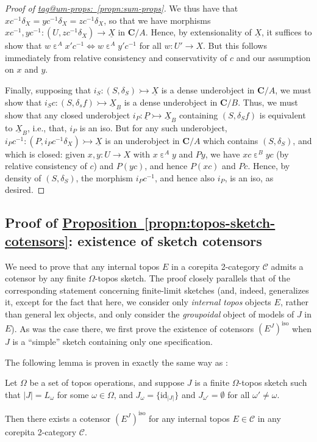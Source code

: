 \documentclass{amsart}
\makeatletter
\newcommand\abs[2][]{#1\lvert{#2}#1\rvert}
\newcommand\alttext{\texorpdfstring}
\newcommand\bC{\mathbf{C}}
\newcommand\cC{\mathcal{C}}
\newcommand\ein{\mathrel{\varepsilon}}
\newcommand\id{\mathrm{id}}
\newcommand\iso{\mathrm{iso}}
\newcommand\I{^{-1}}
\newcommand\set[2][]{#1\{ #2 #1\}}
\newcommand\ToT{\Leftrightarrow}
\newcommand\tto{\rightarrowtail}
\newcommand\und[1]{\underline{#1}}
\newcommand\tagword[1]{\csname tag@#1\endcsname}
\def\label@tag#1:#2\@nil{#1}
\newcommand\labeltag[1]{\label@tag#1:\@nil}
\newcommand\jref[1]{%
  \texorpdfstring%
    {\hyperref[#1]{\tagword{\labeltag{#1}}~\ref*{#1}}}%
    {\tagword{\labeltag{#1}}~\ref*{#1}}%
}
\theoremstyle{definition}
\theoremstyle{remark}
\theoremstyle{plainwithref}
\makeatother
\begin{document}
\begin{proof}[Proof of \jref{propn:sum-props}]
  We thus have that \( x c\I \delta_X = y c\I \delta_X = z c\I \delta_X \), so that we have morphisms \( x c\I,y c\I \colon (U, z c\I \delta_X) \to \und X \) in \( \bC / A \).
  Hence, by extensionality of \( \und X \), it suffices to show that \( w \ein^A x' c\I \ToT w \ein^A y' c\I \) for all \( w \colon U' \to X \).
  But this follows immediately from relative consistency and conservativity of \( c \) and our assumption on \( x \) and \( y \).

  Finally, supposing that \( i_S \colon (S, \delta_S) \tto \und X \) is a dense underobject in \( \bC / A \), we must show that \( i_S c \colon (S, \delta_s f) \tto \und X_B \) is a dense underobject in \( \bC / B \).
  Thus, we must show that any closed underobject \( i_P \colon \und P \tto \und X_B \) containing \( (S, \delta_S f) \) is equivalent to \( \und X_B \), i.e., that, \( i_P \) is an iso.
  But for any such underobject, \( i_P c\I \colon (P, i_P c\I \delta_X) \tto \und X \) is an underobject in \( \bC / A \) which contains \( (S, \delta_S) \), and which is closed: given \( x,y \colon U \to X \) with \( x \ein^A y \) and \( P y \), we have \( x c \ein^B y c \) (by relative consistency of \( c \)) and \( P (y c) \), and hence \( P (x c) \) and \( P c \).
  Hence, by density of \( (S, \delta_S) \), the morphism \( i_P c\I \), and hence also \( i_P \), is an iso, as desired.
\end{proof}

\subsection{Proof of \alttext{\hyperref[propn:topos-sketch-cotensors]{Proposition~\ref*{propn:topos-sketch-cotensors}}}{Proposition~\ref*{propn:topos-sketch-cotensors}}: existence of sketch cotensors} \label{subsec:topos-sketch-cotensors-proof}
We need to prove that any internal topos \( E \) in a corepita 2-category \( \cC \) admits a cotensor by any finite \( \Omega \)-topos sketch.
The proof closely parallels that of the corresponding statement \cite[Proposition~A.0.1]{helfer-topoi-in-topoi} concerning finite-limit sketches (and, indeed, generalizes it, except for the fact that here, we consider only \emph{internal topos} objects \( E \), rather than general lex objects, and only consider the \emph{groupoidal} object of models of \( J \) in \( E \)).
As was the case there, we first prove the existence of cotensors \( (E^J)^\iso \) when \( J \) is a ``simple'' sketch containing only one specification.

The following lemma is proven in exactly the same way as \cite[Lemma~A.0.2]{helfer-topoi-in-topoi}:
\begin{lem} \label{lem:one-spec-sketch-cotensor}
  Let \( \Omega \) be a set of topos operations, and suppose \( J \) is a finite \( \Omega \)-topos sketch such that \( \abs{J} = L_{\omega} \) for some \( \omega \in \Omega \), and \( J_\omega = \set{\id_{\abs{J}}} \) and \( J_{\omega'} = \emptyset \) for all \( \omega' \ne \omega \).

  Then there exists a cotensor \( (E^J)^\iso \) for any internal topos \( E \in \cC \) in any corepita 2-category \( \cC \).
\end{lem}
\end{document}
